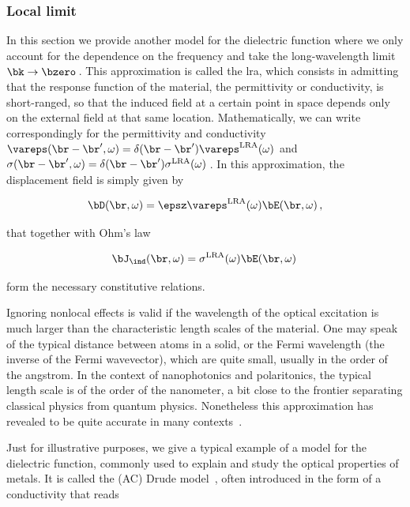 \subsubsection{Local limit}
\label{subsubsec:dielectric_function_local_limit}

In this section we provide another model for the dielectric function where we only account for the dependence on the frequency and take the long-wavelength limit $\bk \to \bzero$\,.
This approximation is called the \gls{lra}, which consists in admitting that the response function of the material, the permittivity or conductivity, is short-ranged, so that the induced field at a certain point in space depends only on the external field at that same location.
Mathematically, we can write correspondingly for the permittivity and conductivity $\vareps (\br - \br',\omega) = \delta (\br - \br') \vareps^{\mathrm{LRA}} (\omega)$ and $\sigma (\br - \br',\omega) = \delta (\br - \br') \sigma^{\mathrm{LRA}} (\omega)$\,.
In this approximation, the displacement field is simply given by

\begin{equation}
\label{eq:displacement_field_LRA}
    \bD(\br,\omega) = \epsz \vareps^{\mathrm{LRA}} (\omega) \bE(\br,\omega)\,,
\end{equation}

\noindent that together with Ohm's law

\begin{equation}
\label{eq:Ohms_law_LRA}
    \bJ_\ind(\br,\omega) = \sigma^{\mathrm{LRA}} (\omega) \bE(\br,\omega)\,
\end{equation}

\noindent form the necessary constitutive relations.

Ignoring nonlocal effects is valid if the wavelength of the optical excitation is much larger than the characteristic length scales of the material.
One may speak of the typical distance between atoms in a solid, or the Fermi wavelength (the inverse of the Fermi wavevector), which are quite small, usually in the order of the angstrom.
In the context of nanophotonics and polaritonics, the typical length scale is of the order of the nanometer, a bit close to the frontier separating classical physics from quantum physics.
Nonetheless this approximation has revealed to be quite accurate in many contexts~\cite{GoncalvesPeres:2016,maier_plasmonics_2007,Hohenester_2020}.

Just for illustrative purposes, we give a typical example of a model for the dielectric function, commonly used to explain and study the optical properties of metals.
It is called the (AC) Drude model~\cite{Drude_1900}, often introduced in the form of a conductivity that reads

